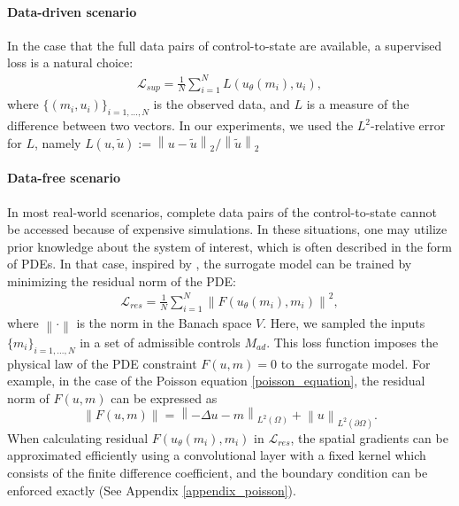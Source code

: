 \documentclass[letterpaper]{article}
\newcommand{\norm}[1]{\left\lVert#1\right\rVert}
\begin{document}
\paragraph{Data-driven scenario}
In the case that the full data pairs of control-to-state are available, a supervised loss is a natural choice:
\begin{align}\label{loss_supervised}
  \mathcal{L}_{sup} = \frac{1}{N}\sum_{i=1}^N L(u_\theta (m_i), u_{i}),
\end{align}
where $\{(m_i, u_{i})\}_{i=1,\dots,N}$ is the observed data, and $L$ is a measure of the difference between two vectors. In our experiments, we used the $L^2$-relative error for $L$, namely $
    L(u, \tilde{u}) := \norm{u - \tilde{u}}_2 / \norm{\tilde{u}}_2
$

\paragraph{Data-free scenario} 
In most real-world scenarios, complete data pairs of the control-to-state cannot be accessed because of expensive simulations. In these situations, one may utilize prior knowledge about the system of interest, which is often described in the form of PDEs. In that case, inspired by \cite{zhu2019physics}, the surrogate model can be trained by minimizing the residual norm of the PDE:
\begin{align}\label{loss_residual}
  \mathcal{L}_{res} = \frac{1}{N}\sum_{i=1}^N \norm{F(u_\theta (m_i), m_i)}^2,
\end{align}
where $\norm{\cdot}$ is the norm in the Banach space $V$. Here, we sampled the inputs $\{m_i\}_{i=1,\dots,N}$ in a set of admissible controls $M_{ad}$. This loss function imposes the physical law of the PDE constraint $F(u, m)=0$ to the surrogate model. For example, in the case of the Poisson equation \eqref{poisson_equation}, the residual norm of $F(u, m)$ can be expressed as
\begin{equation}
   \norm{F(u, m)}=\norm{- \Delta u - m}_{L^2(\Omega)}+\norm{u}_{L^2(\partial\Omega)}.
\end{equation}
When calculating residual $F(u_\theta (m_i), m_i)$ in $\mathcal{L}_{res}$, the spatial gradients can be approximated efficiently using a convolutional layer with a fixed kernel which consists of the finite difference coefficient, and the boundary condition can be enforced exactly (See Appendix \ref{appendix_poisson}).
\end{document}
